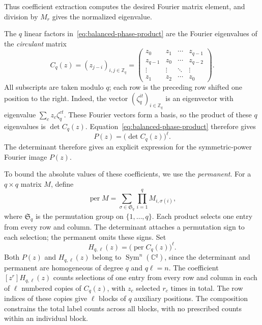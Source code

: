 \documentclass[11pt,a4paper]{article}
\numberwithin{equation}{section}
\numberwithin{figure}{section}
\numberwithin{table}{section}
\numberwithin{footnote}{section}
\theoremstyle{informal}\newtheorem*{informaltheorem}{Informal theorem}
\theoremstyle{definition}\newtheorem{example}{Example}[section]
\theoremstyle{remark}\newtheorem{remark}[theorem]{Remark}
\newcommand{\Z}{\mathbb Z}
\newcommand{\C}{\mathbb C}
\newcommand{\per}{\operatorname{per}}
\begin{document}
Thus coefficient extraction computes the desired Fourier matrix
element, and division by \(M_r\) gives the normalized eigenvalue.

The \(q\) linear factors in~\eqref{eq:balanced-phase-product} are
the Fourier eigenvalues of the \emph{circulant} matrix
\begin{equation}
 C_q(z)=(z_{j-i})_{i,j\in\Z_q}
 =\begin{pmatrix}
 z_0 & z_1 & \cdots & z_{q-1}\\
 z_{q-1} & z_0 & \cdots & z_{q-2}\\
 \vdots & \vdots & \ddots & \vdots\\
 z_1 & z_2 & \cdots & z_0
 \end{pmatrix}.
\end{equation}
All subscripts are taken modulo \(q\); each row is the preceding
row shifted one position to the right. Indeed, the vector
\((\zeta_q^{it})_{i\in\Z_q}\) is an eigenvector with eigenvalue
\(\sum_c z_c\zeta_q^{ct}\). These Fourier vectors form a basis,
so the product of these \(q\) eigenvalues is \(\det C_q(z)\).
Equation~\eqref{eq:balanced-phase-product} therefore gives
\begin{equation}\label{eq:phase-circulant-determinant}
 P(z)=\bigl(\det C_q(z)\bigr)^\ell.
\end{equation}
The determinant therefore gives an explicit expression for the
symmetric-power Fourier image \(P(z)\).

To bound the absolute values of these coefficients, we use the
\emph{permanent}. For a \(q\times q\) matrix \(M\), define
\begin{equation}
 \per M=\sum_{\sigma\in\mathfrak S_q}
              \prod_{i=1}^q M_{i,\sigma(i)},
\end{equation}
where \(\mathfrak S_q\) is the permutation group on
\(\{1,\ldots,q\}\). Each product selects one entry from every row
and column. The determinant attaches a permutation sign to each
selection; the permanent omits these signs. Set
\begin{equation}
 H_{q,\ell}(z)=\bigl(\per C_q(z)\bigr)^\ell.
\end{equation}
Both \(P(z)\) and \(H_{q,\ell}(z)\) belong to
\(\operatorname{Sym}^n(\C^q)\), since the determinant and permanent
are homogeneous of degree \(q\) and \(q\ell=n\).
The coefficient \([z^r]H_{q,\ell}(z)\) counts selections of one
entry from every row and column in each of \(\ell\) numbered
copies of \(C_q(z)\), with \(z_c\) selected \(r_c\) times in
total. The row indices of these copies give \(\ell\) blocks of
\(q\) auxiliary positions. The composition constrains the total
label counts across all blocks, with no prescribed counts within
an individual block.
\end{document}
